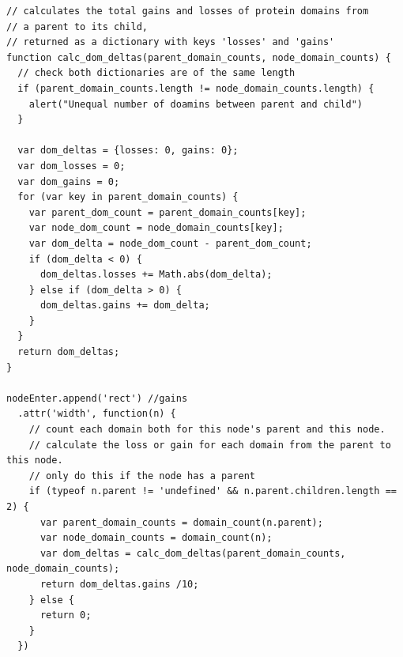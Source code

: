 \documentclass[12pt,a4paper]{article}
\begin{document}
\begin{verbatim}
// calculates the total gains and losses of protein domains from
// a parent to its child,
// returned as a dictionary with keys 'losses' and 'gains'
function calc_dom_deltas(parent_domain_counts, node_domain_counts) {
  // check both dictionaries are of the same length
  if (parent_domain_counts.length != node_domain_counts.length) {
    alert("Unequal number of doamins between parent and child")
  }

  var dom_deltas = {losses: 0, gains: 0};
  var dom_losses = 0;
  var dom_gains = 0;
  for (var key in parent_domain_counts) {
    var parent_dom_count = parent_domain_counts[key];
    var node_dom_count = node_domain_counts[key];
    var dom_delta = node_dom_count - parent_dom_count;
    if (dom_delta < 0) {
      dom_deltas.losses += Math.abs(dom_delta);
    } else if (dom_delta > 0) {
      dom_deltas.gains += dom_delta;
    }
  }
  return dom_deltas;
}

nodeEnter.append('rect') //gains
  .attr('width', function(n) {
    // count each domain both for this node's parent and this node.
    // calculate the loss or gain for each domain from the parent to this node.
    // only do this if the node has a parent
    if (typeof n.parent != 'undefined' && n.parent.children.length == 2) {
      var parent_domain_counts = domain_count(n.parent);
      var node_domain_counts = domain_count(n);
      var dom_deltas = calc_dom_deltas(parent_domain_counts, node_domain_counts);
      return dom_deltas.gains /10;
    } else {
      return 0;
    }
  })
\end{verbatim}
\normalsize
\doublespace

\newpage


\end{document}
